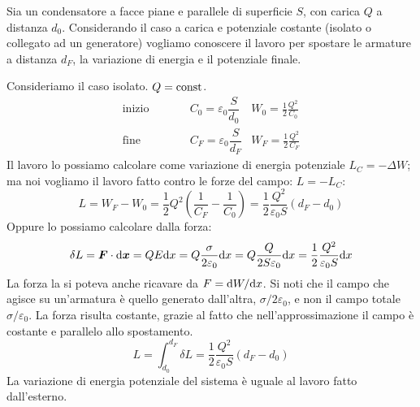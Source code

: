 \begin{Es}
  Sia un condensatore a facce piane e parallele di superficie $S$, con carica $Q$ a distanza $d_0$. Considerando il caso a carica e potenziale costante (isolato o collegato ad un generatore) vogliamo conoscere il lavoro per spostare le armature a distanza $d_F$, la variazione di energia e il potenziale finale.

  Consideriamo il caso isolato. $Q=\text{const}$.
  \begin{equation*}
    \begin{aligned}
      \text{inizio} & \qquad & C_0=\varepsilon_0\dfrac{S}{d_0} & W_0 = \frac{1}{2}\frac{Q^2}{C_0}
      \\
      \text{fine}   & \qquad & C_F=\varepsilon_0\dfrac{S}{d_F} & W_F = \frac{1}{2}\frac{Q^2}{C_F}
    \end{aligned}
  \end{equation*}
  Il lavoro lo possiamo calcolare come variazione di energia potenziale $L_C=-\Delta W$; ma noi vogliamo il lavoro fatto contro le forze del campo: $L=-L_C$:
  \[
    L=W_F-W_0=\frac{1}{2}Q^2\left(\frac{1}{C_F}-\frac{1}{C_0}\right) = \frac{1}{2}\frac{Q^2}{\varepsilon_0 S}\left(d_F-d_0\right)
  \]
  Oppure lo possiamo calcolare dalla forza:
  \[\delta L=\boldsymbol{F}\cdot\mathrm{d} \boldsymbol{x}=QE\mathrm{d} x=Q\frac{\sigma}{2\varepsilon_0}\mathrm{d} x=Q\frac{Q}{2S\varepsilon_0}\mathrm{d} x=\frac{1}{2}\frac{Q^2}{\varepsilon_0 S}\mathrm{d} x\]
  La forza la si poteva anche ricavare da $F=\mathrm{d} W/\mathrm{d} x$. Si noti che il campo che agisce su un'armatura è quello generato dall'altra, $\sigma/2\varepsilon_0$, e non il campo totale $\sigma/\varepsilon_0$. La forza risulta costante, grazie al fatto che nell'approssimazione il campo è costante e parallelo allo spostamento.
  \[L=\int_{d_0}^{d_F}\delta L=\frac{1}{2}\frac{Q^2}{\varepsilon_0 S}(d_F-d_0)\]
  La variazione di energia potenziale del sistema è uguale al lavoro fatto dall'esterno.


\end{Es}
